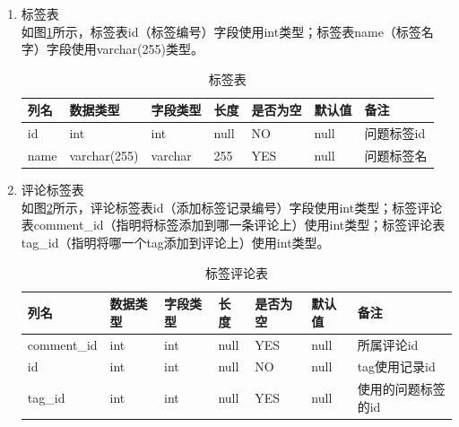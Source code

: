 \begin{enumerate}
\begin{table}[H]
\begin{tabular}{|l|l|l|l|l|l|l|}
              \end{tabular}
          \end{table}
    \item 标签表\\
          如图\ref{db-tag}所示，标签表id（标签编号）字段使用int类型；标签表name（标签名字）字段使用varchar(255)类型。
          \begin{table}[H]
              \centering
              \song\wuhao
              \caption{标签表}
              \label{db-tag}
              \begin{tabular}{|l|l|l|l|l|l|l|}
                  \hline
                  列名 & 数据类型     & 字段类型 & 长度 & 是否为空 & 默认值 & 备注       \\ \hline
                  id   & int          & int      & null & NO       & null   & 问题标签id \\ \hline
                  name & varchar(255) & varchar  & 255  & YES      & null   & 问题标签名 \\ \hline
              \end{tabular}
          \end{table}
    \item 评论标签表\\
          如图\ref{db-tag-comment}所示，评论标签表id（添加标签记录编号）字段使用int类型；标签评论表comment\_id（指明将标签添加到哪一条评论上）使用int类型；标签评论表tag\_id（指明将哪一个tag添加到评论上）使用int类型。
          \begin{table}[]
              \centering
              \song\wuhao
              \caption{标签评论表}
              \label{db-tag-comment}
              \begin{tabular}{|l|l|l|l|l|l|l|}
                  \hline
                  列名        & 数据类型 & 字段类型 & 长度 & 是否为空 & 默认值 & 备注               \\ \hline
                  comment\_id & int      & int      & null & YES      & null   & 所属评论id         \\ \hline
                  id          & int      & int      & null & NO       & null   & tag使用记录id      \\ \hline
                  tag\_id     & int      & int      & null & YES      & null   & 使用的问题标签的id \\ \hline
              \end{tabular}
          \end{table}
\end{enumerate}

